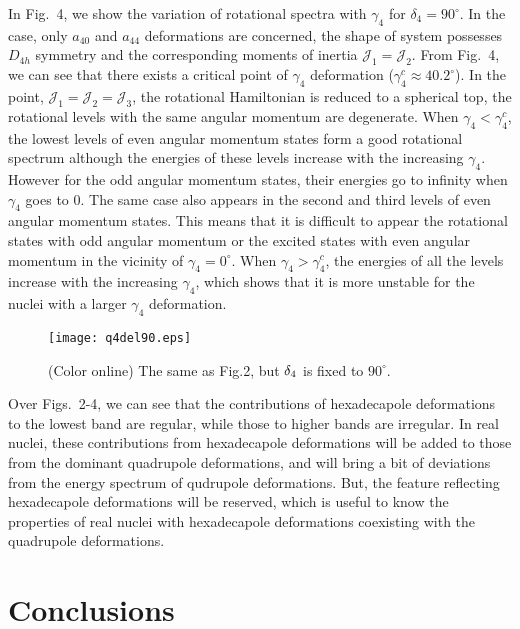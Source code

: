 \documentclass[twocolumn,prc,showpacs,preprintnumbers,superscriptaddress,floatfix]{revtex4}
\begin{document}
In Fig.~4, we show the variation of rotational spectra with $\gamma _{4}$
for $\delta _{4}=90^{\circ }$. In the case, only $a_{40}$ and $a_{44}$
deformations are concerned, the shape of system possesses $D_{4h}$ symmetry
and the corresponding moments of inertia $\mathscr{J}_{1}=\mathscr{J}_{2}$.
From Fig.~4, we can see that there exists a critical point of $\gamma _{4}$
deformation ($\gamma _{4}^{c}\approx 40.2^{\circ }$). In the point, $%
\mathscr{J}_{1}=\mathscr{J}_{2}=\mathscr{J}_{3}$, the rotational Hamiltonian
is reduced to a spherical top, the rotational levels with the same angular
momentum are degenerate. When $\gamma _{4}<\gamma _{4}^{c}$, the lowest
levels of even angular momentum states form a good rotational spectrum
although the energies of these levels increase with the increasing $\gamma
_{4}$. However for the odd angular momentum states, their energies go to
infinity when $\gamma _{4}$ goes to $0$. The same case also appears in the
second and third levels of even angular momentum states. This means that it
is difficult to appear the rotational states with odd angular momentum or
the excited states with even angular momentum in the vicinity of $\gamma
_{4}=0^{\circ }$. When $\gamma _{4}>\gamma _{4}^{c}$, the energies of all
the levels increase with the increasing $\gamma _{4}$, which shows that it
is more unstable for the nuclei with a larger $\gamma _{4}$ deformation.
\begin{figure}[tbp]
\texttt{[image: q4del90.eps]}
\caption{(Color online) The same as Fig.2, but $\protect\delta_4 $ is fixed
to $90^{\circ }$.}
\end{figure}

Over Figs.~2-4, we can see that the contributions of hexadecapole
deformations to the lowest band are regular, while those to higher bands are
irregular. In real nuclei, these contributions from hexadecapole
deformations will be added to those from the dominant quadrupole
deformations, and will bring a bit of deviations from the energy spectrum of
qudrupole deformations. But, the feature reflecting hexadecapole
deformations will be reserved, which is useful to know the properties of
real nuclei with hexadecapole deformations coexisting with the quadrupole
deformations.

\section{Conclusions}
\end{document}
